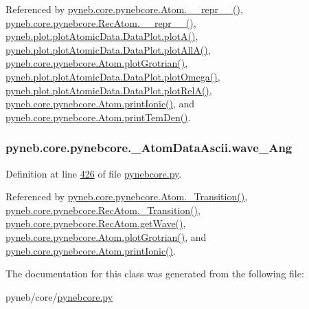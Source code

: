 Referenced by \hyperlink{pynebcore_8py_source_l02544}{pyneb.\+core.\+pynebcore.\+Atom.\+\_\+\+\_\+repr\+\_\+\+\_\+()}, \hyperlink{pynebcore_8py_source_l03032}{pyneb.\+core.\+pynebcore.\+Rec\+Atom.\+\_\+\+\_\+repr\+\_\+\+\_\+()}, \hyperlink{plot_atomic_data_8py_source_l00116}{pyneb.\+plot.\+plot\+Atomic\+Data.\+Data\+Plot.\+plot\+A()}, \hyperlink{plot_atomic_data_8py_source_l00188}{pyneb.\+plot.\+plot\+Atomic\+Data.\+Data\+Plot.\+plot\+All\+A()}, \hyperlink{pynebcore_8py_source_l02372}{pyneb.\+core.\+pynebcore.\+Atom.\+plot\+Grotrian()}, \hyperlink{plot_atomic_data_8py_source_l00372}{pyneb.\+plot.\+plot\+Atomic\+Data.\+Data\+Plot.\+plot\+Omega()}, \hyperlink{plot_atomic_data_8py_source_l00261}{pyneb.\+plot.\+plot\+Atomic\+Data.\+Data\+Plot.\+plot\+Rel\+A()}, \hyperlink{pynebcore_8py_source_l02167}{pyneb.\+core.\+pynebcore.\+Atom.\+print\+Ionic()}, and \hyperlink{pynebcore_8py_source_l02253}{pyneb.\+core.\+pynebcore.\+Atom.\+print\+Tem\+Den()}.

\hypertarget{classpyneb_1_1core_1_1pynebcore_1_1___atom_data_ascii_a1366f737e51b5a0f3706b68b0d06bfe5}{}
\subsubsection[{wave\+\_\+\+Ang}]{\setlength{\rightskip}{0pt plus 5cm}pyneb.\+core.\+pynebcore.\+\_\+\+Atom\+Data\+Ascii.\+wave\+\_\+\+Ang}\label{classpyneb_1_1core_1_1pynebcore_1_1___atom_data_ascii_a1366f737e51b5a0f3706b68b0d06bfe5}


Definition at line \hyperlink{pynebcore_8py_source_l00426}{426} of file \hyperlink{pynebcore_8py_source}{pynebcore.\+py}.



Referenced by \hyperlink{pynebcore_8py_source_l01367}{pyneb.\+core.\+pynebcore.\+Atom.\+\_\+\+Transition()}, \hyperlink{pynebcore_8py_source_l02696}{pyneb.\+core.\+pynebcore.\+Rec\+Atom.\+\_\+\+Transition()}, \hyperlink{pynebcore_8py_source_l02623}{pyneb.\+core.\+pynebcore.\+Rec\+Atom.\+get\+Wave()}, \hyperlink{pynebcore_8py_source_l02372}{pyneb.\+core.\+pynebcore.\+Atom.\+plot\+Grotrian()}, and \hyperlink{pynebcore_8py_source_l02167}{pyneb.\+core.\+pynebcore.\+Atom.\+print\+Ionic()}.



The documentation for this class was generated from the following file\+:\begin{DoxyCompactItemize}
\item 
pyneb/core/\hyperlink{pynebcore_8py}{pynebcore.\+py}\end{DoxyCompactItemize}
